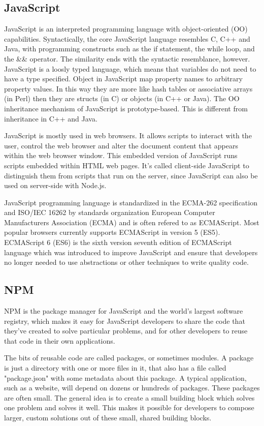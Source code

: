 \subsection{JavaScript}
JavaScript is an interpreted programming language with object-oriented (OO) capabilities. Syntactically, the core JavaScript language resembles C, C++ and Java, with programming constructs such as the if statement, the while loop, and the && operator. The similarity ends with the syntactic resemblance, however. JavaScript is a loosly typed language, which means that variables do not need to have a type specified. Object in JavaScript map property names to arbitrary property values. In this way they are more like hash tables or associative arrays (in Perl) then they are structs (in C) or objects (in C++ or Java). The OO inheritance mechanism of JavaScript is prototype-based. This is different from inheritance in C++ and Java.

JavaScript is mostly used in web browsers. It allows scripts to interact with the user, control the web browser and alter the document content that appears within the web browser window. This embedded version of JavaScript runs scripts embedded within HTML web pages. It's called client-side JavaScript to distinguish them from scripts that run on the server, since JavaScript can also be used on server-side with Node.js.

JavaScript programming language is standardized in the ECMA-262 specification and ISO/IEC 16262 by standards organization European Computer Manufacturers Association (ECMA) and is often refered to as ECMAScript. Most popular browsers currently supports ECMAScript in version 5 (ES5). ECMAScript 6 (ES6) is the sixth version seventh edition of ECMAScript language which was introduced to improve JavaScript and ensure that developers no longer needed to use abstractions or other techniques to write quality code.\cite{narayan}

\subsection{NPM}
NPM is the package manager for JavaScript and the world’s largest software registry, which makes it easy for JavaScript developers to share the code that they've created to solve particular problems, and for other developers to reuse that code in their own applications.\cite{npm}

The bits of reusable code are called packages, or sometimes modules. A package is just a directory with one or more files in it, that also has a file called "package.json" with some metadata about this package. A typical application, such as a website, will depend on dozens or hundreds of packages. These packages are often small. The general idea is to create a small building block which solves one problem and solves it well. This makes it possible for developers to compose larger, custom solutions out of these small, shared building blocks.\cite{npm}


